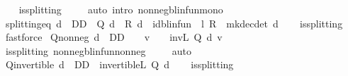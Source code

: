 \begin{isabellebody}
%
\isadelimproof
\ \ %
\endisadelimproof
%
\isatagproof
{}\isamarkupfalse%
\ is{\isacharunderscore}{\kern0pt}splitting\ \isanewline
\ \ \isamarkupfalse%
\ {\isacharparenleft}{\kern0pt}auto\ intro{\isacharbang}{\kern0pt}{\isacharcolon}{\kern0pt}\ nonneg{\isacharunderscore}{\kern0pt}blinfun{\isacharunderscore}{\kern0pt}mono{\isacharparenright}{\kern0pt}%
\endisatagproof
{\isafoldproof}%
%
\isadelimproof
\isanewline
%
\endisadelimproof
\isanewline
{}\isamarkupfalse%
\ splitting{\isacharunderscore}{\kern0pt}eq{\isacharcolon}{\kern0pt}\ {\isachardoublequoteopen}d\ {\isasymin}\ D\isactrlsub D\ {\isasymLongrightarrow}\ Q\ d\ {\isacharminus}{\kern0pt}\ R\ d\ {\isacharequal}{\kern0pt}\ {\isacharparenleft}{\kern0pt}id{\isacharunderscore}{\kern0pt}blinfun\ {\isacharminus}{\kern0pt}\ l\ {\isacharasterisk}{\kern0pt}\isactrlsub R\ {\isasymP}\ {\isacharparenleft}{\kern0pt}mk{\isacharunderscore}{\kern0pt}dec{\isacharunderscore}{\kern0pt}det\ d{\isacharparenright}{\kern0pt}{\isacharparenright}{\kern0pt}{\isachardoublequoteclose}\isanewline
%
\isadelimproof
\ \ %
\endisadelimproof
%
\isatagproof
{}\isamarkupfalse%
\ is{\isacharunderscore}{\kern0pt}splitting\isanewline
\ \ \isamarkupfalse%
\ fastforce%
\endisatagproof
{\isafoldproof}%
%
\isadelimproof
\isanewline
%
\endisadelimproof
\isanewline
{}\isamarkupfalse%
\ Q{\isacharunderscore}{\kern0pt}nonneg{\isacharcolon}{\kern0pt}\ {\isachardoublequoteopen}d\ {\isasymin}\ D\isactrlsub D\ {\isasymLongrightarrow}\ {}\ {\isasymle}\ v\ {\isasymLongrightarrow}\ {}\ {\isasymle}\ inv\isactrlsub L\ {\isacharparenleft}{\kern0pt}Q\ d{\isacharparenright}{\kern0pt}\ v{\isachardoublequoteclose}\isanewline
%
\isadelimproof
\ \ %
\endisadelimproof
%
\isatagproof
{}\isamarkupfalse%
\ is{\isacharunderscore}{\kern0pt}splitting\ nonneg{\isacharunderscore}{\kern0pt}blinfun{\isacharunderscore}{\kern0pt}nonneg\ \isanewline
\ \ \isamarkupfalse%
\ auto%
\endisatagproof
{\isafoldproof}%
%
\isadelimproof
\isanewline
%
\endisadelimproof
\isanewline
{}\isamarkupfalse%
\ Q{\isacharunderscore}{\kern0pt}invertible{\isacharcolon}{\kern0pt}\ {\isachardoublequoteopen}d\ {\isasymin}\ D\isactrlsub D\ {\isasymLongrightarrow}\ invertible\isactrlsub L\ {\isacharparenleft}{\kern0pt}Q\ d{\isacharparenright}{\kern0pt}{\isachardoublequoteclose}\isanewline
%
\isadelimproof
\ \ %
\endisadelimproof
%
\isatagproof
{}\isamarkupfalse%
\ is{\isacharunderscore}{\kern0pt}splitting\isanewline

\end{isabellebody}
